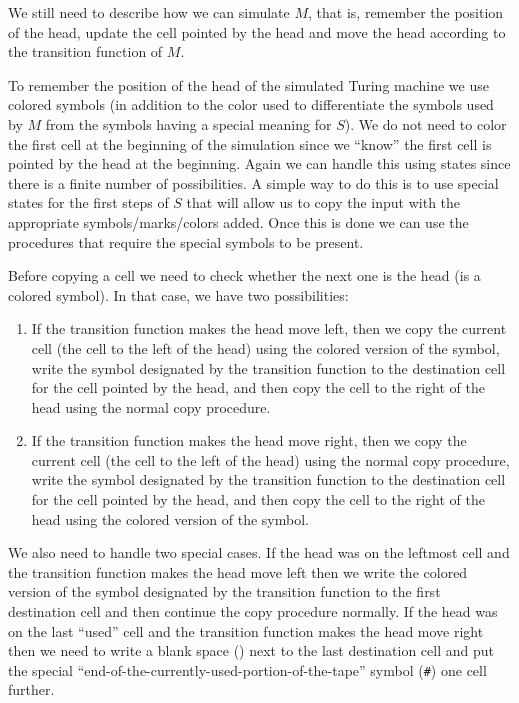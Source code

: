 \documentclass{article}
\newcommand\obullet[1]{\ThisStyle{\ensurestackMath{%
  \stackon[1pt]{\SavedStyle#1}{\SavedStyle\kern.6\LMpt\bullet}}}}
\newcommand{\blank}{\textvisiblespace}
\begin{document}
We still need to describe how we can simulate \(M\), that is, remember the
position of the head, update the cell pointed by the head and move the head
according to the transition function of \(M\).

To remember the position of the head of the simulated Turing machine we use
colored symbols (in addition to the color used to differentiate the symbols
used by \(M\) from the symbols having a special meaning for \(S\)).
We do not need to color the first cell at the beginning of
the simulation since we ``know'' the first cell is pointed by the head at the
beginning. Again we can handle this using states since there is a finite number
of possibilities. A simple way to do this is to use special states for the
first steps of \(S\) that will allow us to copy the input with the
appropriate symbols/marks/colors added. Once this is done we can use the
procedures that require the special symbols to be present.

Before copying a cell we need to check whether the next one is the head (is a
colored symbol).
In that case, we have two possibilities:
\begin{enumerate}
\item If the transition function makes the head move left, then
we copy the current cell (the cell to the left of the
head) using the colored version of the symbol, write the symbol designated by
the transition function to the destination cell for the
cell pointed by the head, and then copy the cell to the right of the head
using the normal copy procedure.
\item If the transition function makes the head move right, then
we copy the current cell (the cell to the left of the
head) using the normal copy procedure, write the symbol designated by
the transition function to the destination cell for the
cell pointed by the head, and then copy the cell to the right of the head
using the colored version of the symbol.
\end{enumerate}

We also need to handle two special cases.
If the head was on the leftmost cell and the transition function makes the
head move left then we write the colored version of the symbol designated by
the transition function to the first destination cell and then continue the
copy procedure normally.
If the head was on the last ``used'' cell and the transition function makes
the head move right then we need to write a blank space (\texttt{\obullet{\blank}}) next to the
last destination
cell and put the special
``end-of-the-currently-used-portion-of-the-tape'' symbol (\texttt{\#})
one cell further.
\end{document}
